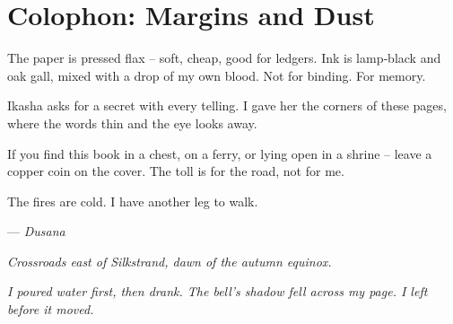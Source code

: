 \chapter*{Colophon: Margins and Dust}

The paper is pressed flax -- soft, cheap, good for ledgers. Ink is lamp‑black and oak gall, mixed with a drop of my own blood. Not for binding. For memory.

\smallskip

Ikasha asks for a secret with every telling. I gave her the corners of these pages, where the words thin and the eye looks away.

\smallskip

If you find this book in a chest, on a ferry, or lying open in a shrine -- leave a copper coin on the cover. The toll is for the road, not for me.

\smallskip

The fires are cold. I have another leg to walk.

\smallskip

\noindent --- \textit{Dusana}  

\noindent \textit{Crossroads east of Silkstrand, dawn of the autumn equinox.}  

\noindent \textit{I poured water first, then drank. The bell's shadow fell across my page. I left before it moved.}

